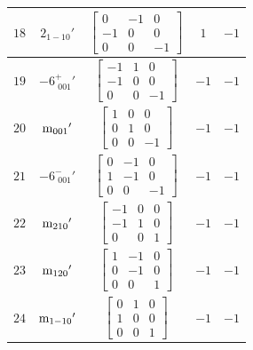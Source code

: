 \documentclass[fleqn,8pt]{jsarticle}
\begin{document}
\begin{longtable}{ccccc}
$ 18 $ & $ 2{}_{1-10}{}' $ & $ \begin{bmatrix} 0 & -1 & 0 \\ -1 & 0 & 0 \\ 0 & 0 & -1 \end{bmatrix} $ & $ 1 $ & $ -1 $ \\ \hline
$ 19 $ & $ -6^{+}_{\,\,001}{}' $ & $ \begin{bmatrix} -1 & 1 & 0 \\ -1 & 0 & 0 \\ 0 & 0 & -1 \end{bmatrix} $ & $ -1 $ & $ -1 $ \\ \hline
$ 20 $ & $ {\rm m}_{001}{}' $ & $ \begin{bmatrix} 1 & 0 & 0 \\ 0 & 1 & 0 \\ 0 & 0 & -1 \end{bmatrix} $ & $ -1 $ & $ -1 $ \\ \hline
$ 21 $ & $ -6^{-}_{\,\,001}{}' $ & $ \begin{bmatrix} 0 & -1 & 0 \\ 1 & -1 & 0 \\ 0 & 0 & -1 \end{bmatrix} $ & $ -1 $ & $ -1 $ \\ \hline
$ 22 $ & $ {\rm m}_{210}{}' $ & $ \begin{bmatrix} -1 & 0 & 0 \\ -1 & 1 & 0 \\ 0 & 0 & 1 \end{bmatrix} $ & $ -1 $ & $ -1 $ \\ \hline
$ 23 $ & $ {\rm m}_{120}{}' $ & $ \begin{bmatrix} 1 & -1 & 0 \\ 0 & -1 & 0 \\ 0 & 0 & 1 \end{bmatrix} $ & $ -1 $ & $ -1 $ \\ \hline
$ 24 $ & $ {\rm m}_{1-10}{}' $ & $ \begin{bmatrix} 0 & 1 & 0 \\ 1 & 0 & 0 \\ 0 & 0 & 1 \end{bmatrix} $ & $ -1 $ & $ -1 $ \\
\end{longtable}
\end{document}

